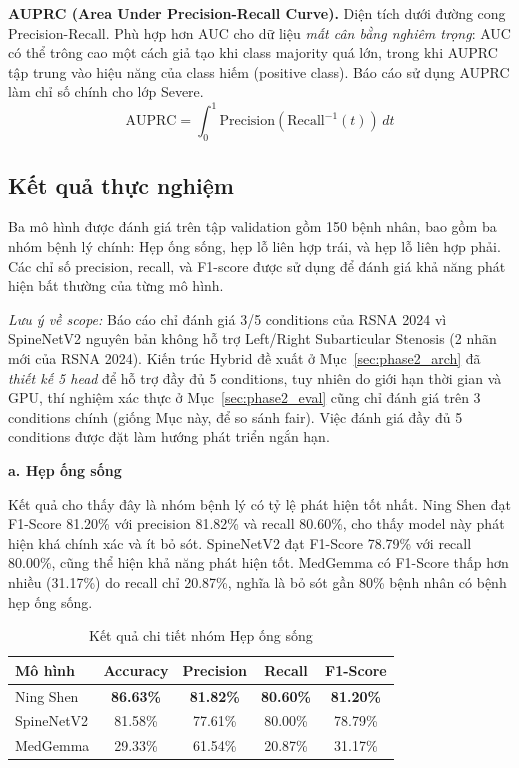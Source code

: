 \textbf{AUPRC (Area Under Precision-Recall Curve).} Diện tích dưới đường cong Precision-Recall. Phù hợp hơn AUC cho dữ liệu \emph{mất cân bằng nghiêm trọng}: AUC có thể trông cao một cách giả tạo khi class majority quá lớn, trong khi AUPRC tập trung vào hiệu năng của class hiếm (positive class). Báo cáo sử dụng AUPRC làm chỉ số chính cho lớp Severe.
\begin{equation}
    \text{AUPRC} = \int_0^1 \text{Precision}(\text{Recall}^{-1}(t)) \, dt
\end{equation}

\newpage
\subsection{Kết quả thực nghiệm}

Ba mô hình được đánh giá trên tập validation gồm 150 bệnh nhân, bao gồm ba nhóm bệnh lý chính: Hẹp ống sống, hẹp lỗ liên hợp trái, và hẹp lỗ liên hợp phải. Các chỉ số precision, recall, và F1-score được sử dụng để đánh giá khả năng phát hiện bất thường của từng mô hình.

\textit{Lưu ý về scope:} Báo cáo chỉ đánh giá 3/5 conditions của RSNA 2024 vì SpineNetV2 nguyên bản không hỗ trợ Left/Right Subarticular Stenosis (2 nhãn mới của RSNA 2024). Kiến trúc Hybrid đề xuất ở Mục~\ref{sec:phase2_arch} đã \emph{thiết kế 5 head} để hỗ trợ đầy đủ 5 conditions, tuy nhiên do giới hạn thời gian và GPU, thí nghiệm xác thực ở Mục~\ref{sec:phase2_eval} cũng chỉ đánh giá trên 3 conditions chính (giống Mục này, để so sánh fair). Việc đánh giá đầy đủ 5 conditions được đặt làm hướng phát triển ngắn hạn.

\textbf{a. Hẹp ống sống}

Kết quả cho thấy đây là nhóm bệnh lý có tỷ lệ phát hiện tốt nhất. Ning Shen đạt F1-Score 81.20\% với precision 81.82\% và recall 80.60\%, cho thấy model này phát hiện khá chính xác và ít bỏ sót. SpineNetV2 đạt F1-Score 78.79\% với recall 80.00\%, cũng thể hiện khả năng phát hiện tốt. MedGemma có F1-Score thấp hơn nhiều (31.17\%) do recall chỉ 20.87\%, nghĩa là bỏ sót gần 80\% bệnh nhân có bệnh hẹp ống sống.

\begin{table}[H]
    \centering
    \caption{Kết quả chi tiết nhóm Hẹp ống sống}
    \label{tab:scs_metrics}
    \renewcommand{\arraystretch}{1.2}
    \begin{tabular}{lcccc}
        \toprule
        \textbf{Mô hình} & \textbf{Accuracy} & \textbf{Precision} & \textbf{Recall} & \textbf{F1-Score} \\
        \midrule
        Ning Shen & \textbf{86.63\%} & \textbf{81.82\%} & \textbf{80.60\%} & \textbf{81.20\%} \\
        SpineNetV2 & 81.58\% & 77.61\% & 80.00\% & 78.79\% \\
        MedGemma & 29.33\% & 61.54\% & 20.87\% & 31.17\% \\
        \bottomrule
    \end{tabular}
\end{table}


